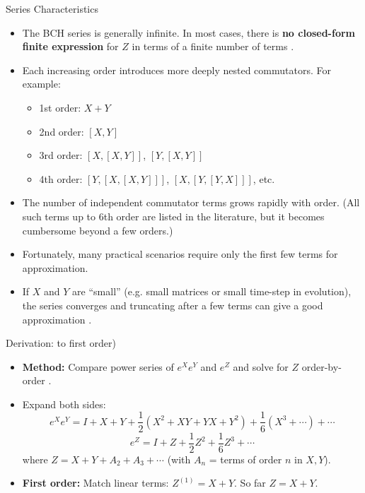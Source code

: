 \documentclass{beamer}
\begin{document}
\begin{frame}{Series Characteristics}
\begin{itemize}
\item The BCH series is generally infinite. In most cases, there is \textbf{no closed-form finite expression} for $Z$ in terms of a finite number of terms .
\item Each increasing order introduces more deeply nested commutators. For example:
\begin{itemize}
\item 1st order: $X+Y$
\item 2nd order: $[X,Y]$
\item 3rd order: $[X,[X,Y]]$, $[Y,[X,Y]]$
\item 4th order: $[Y,[X,[X,Y]]]$, $[X,[Y,[Y,X]]]$, etc.
\end{itemize}
\item The number of independent commutator terms grows rapidly with order. (All such terms up to 6th order are listed in the literature, but it becomes cumbersome beyond a few orders.)
\item Fortunately, many practical scenarios require only the first few terms for approximation.
\item If $X$ and $Y$ are “small” (e.g. small matrices or small time-step in evolution), the series converges and truncating after a few terms can give a good approximation .
\end{itemize}
\end{frame}

\begin{frame}{Derivation: to first order)}
\begin{itemize}
\item \textbf{Method:} Compare power series of $e^X e^Y$ and $e^Z$ and solve for $Z$ order-by-order .
\item Expand both sides:
\[
e^X e^Y = I + X + Y + \frac{1}{2}(X^2 + XY + YX + Y^2) + \frac{1}{6}(X^3 + \cdots) + \cdots
\]
\[
e^Z = I + Z + \frac{1}{2}Z^2 + \frac{1}{6}Z^3 + \cdots
\]
where $Z = X + Y + A_2 + A_3 + \cdots$ (with $A_n$ = terms of order $n$ in $X,Y$).
\item \textbf{First order:} Match linear terms: $Z^{(1)} = X + Y$. So far $Z = X+Y$.
\end{itemize}
\end{frame}
\end{document}
